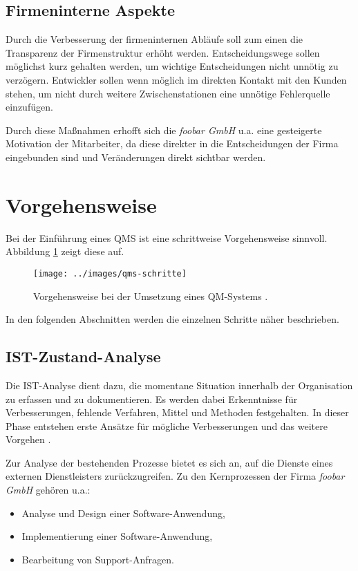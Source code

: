 \subsection{Firmeninterne Aspekte}
Durch die Verbesserung der firmeninternen Abläufe soll zum einen die Transparenz
der Firmenstruktur erhöht werden. Entscheidungswege sollen möglichst kurz
gehalten werden, um wichtige Entscheidungen nicht unnötig zu verzögern.
Entwickler sollen wenn möglich im direkten Kontakt mit den Kunden stehen, um
nicht durch weitere Zwischenstationen eine unnötige Fehlerquelle einzufügen.

Durch diese Maßnahmen erhofft sich die \emph{foobar GmbH} u.a. eine gesteigerte
Motivation der Mitarbeiter, da diese direkter in die Entscheidungen der Firma
eingebunden sind und Veränderungen direkt sichtbar werden.

\section{Vorgehensweise}
Bei der Einführung eines QMS ist eine schrittweise Vorgehensweise sinnvoll. 
Abbildung \ref{fig:qms-schritte} zeigt diese auf.

\begin{figure} 
  \centering
  \texttt{[image: ../images/qms-schritte]}
  \caption{Vorgehensweise bei der Umsetzung eines QM-Systems 
  \citep[vgl.][]{quas}.}
  \label{fig:qms-schritte}
\end{figure}

In den folgenden Abschnitten werden die einzelnen Schritte näher beschrieben.

\subsection{IST-Zustand-Analyse}
Die IST-Analyse dient dazu, die momentane Situation innerhalb der Organisation
zu erfassen und zu dokumentieren. Es werden dabei Erkenntnisse für
Verbesserungen, fehlende Verfahren, Mittel und Methoden festgehalten. In dieser
Phase entstehen erste Ansätze für mögliche Verbesserungen und das weitere
Vorgehen \citep{url:zert}.

Zur Analyse der bestehenden Prozesse bietet es sich an, auf die Dienste eines
externen Dienstleisters zurückzugreifen. Zu den Kernprozessen der Firma
\emph{foobar GmbH} gehören u.a.:

\begin{itemize}
  \item Analyse und Design einer Software-Anwendung,
  \item Implementierung einer Software-Anwendung,
  \item Bearbeitung von Support-Anfragen.
\end{itemize}

